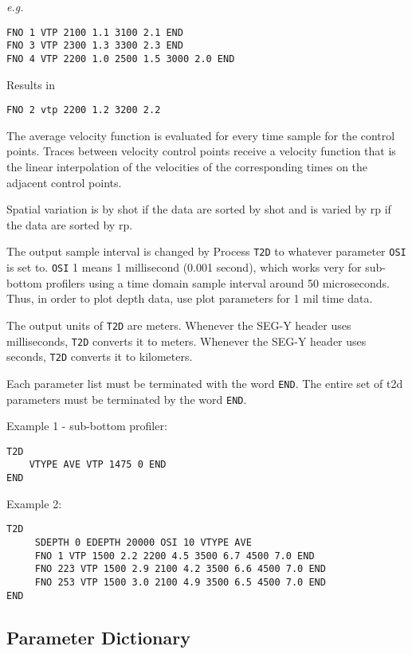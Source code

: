 \textit{e.g.}
\begin{verbatim}
FNO 1 VTP 2100 1.1 3100 2.1 END
FNO 3 VTP 2300 1.3 3300 2.3 END
FNO 4 VTP 2200 1.0 2500 1.5 3000 2.0 END
\end{verbatim}

Results in
\begin{verbatim}
FNO 2 vtp 2200 1.2 3200 2.2
\end{verbatim}

The average velocity function is evaluated for every time sample for the
control points.  Traces between velocity control points receive a
velocity function that is the linear interpolation of the velocities of
the corresponding times on the adjacent control points.

Spatial variation is by \gls{shot} if the data are sorted by \gls{shot} and is varied
by \gls{rp} if the data are sorted by \gls{rp}.

The output sample interval is changed by Process \texttt{T2D} to whatever parameter
\texttt{OSI} is set to.  \texttt{OSI} 1 means 1 millisecond (0.001 second), which works very
for sub-bottom profilers using a time domain sample interval around 50
microseconds. Thus, in order to plot depth data, use plot parameters for 1
mil time data.

The output units of \texttt{T2D} are meters.  Whenever the SEG-Y header uses
milliseconds, \texttt{T2D} converts it to meters. Whenever the SEG-Y header uses
seconds, \texttt{T2D} converts it to kilometers.

Each parameter list must be terminated with the word \texttt{END}.  The entire set
of t2d parameters must be terminated by the word \texttt{END}.

Example 1 - sub-bottom profiler:
\begin{verbatim}
T2D
    VTYPE AVE VTP 1475 0 END
END
\end{verbatim}

Example 2:
\begin{verbatim}
T2D
     SDEPTH 0 EDEPTH 20000 OSI 10 VTYPE AVE
     FNO 1 VTP 1500 2.2 2200 4.5 3500 6.7 4500 7.0 END
     FNO 223 VTP 1500 2.9 2100 4.2 3500 6.6 4500 7.0 END
     FNO 253 VTP 1500 3.0 2100 4.9 3500 6.5 4500 7.0 END
END
\end{verbatim}

\subsection{Parameter Dictionary}

